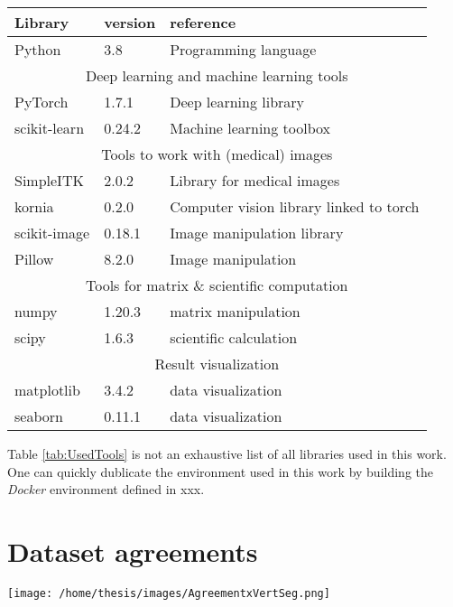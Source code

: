 \begin{SCtable}[\sidecaptionrelwidth][h]
 
  \begin{tabular}{ p{2cm} l l } 
   \hline
   \hline
   \textbf{Library} & \textbf{version} & \textbf{reference}    \\
   \hline 
  Python & 3.8 & Programming language \\
   \hline
   \multicolumn{3}{c}{Deep learning and machine learning tools} \\
   \hline
   PyTorch & 1.7.1 & Deep learning library \\ 
   scikit-learn & 0.24.2 & Machine learning toolbox \\
   \hline
   \multicolumn{3}{c}{Tools to work with (medical) images} \\
   \hline
   SimpleITK & 2.0.2 & Library for medical images \\ 
   kornia & 0.2.0 & Computer vision library linked to torch \\
   scikit-image & 0.18.1 & Image manipulation library \\
   Pillow & 8.2.0 & Image manipulation\\
   \hline
   \multicolumn{3}{c}{Tools for matrix \& scientific computation} \\
   \hline
   numpy & 1.20.3 & matrix manipulation \\
   scipy & 1.6.3 & scientific calculation \\
   \hline
   \multicolumn{3}{c}{Result visualization} \\
   \hline
   matplotlib & 3.4.2 & data visualization \\ 
   seaborn & 0.11.1 & data visualization \\
   \hline
   \hline
  \end{tabular}
  \caption{Python libraries used. \label{tab:UsedTools}}

\end{SCtable}

Table \ref{tab:UsedTools} is not an exhaustive list of all libraries used in this work.
One can quickly dublicate the environment used in this work by building the \textit{Docker} environment defined in xxx.


\chapter{Dataset agreements\label{seg:datasetagreement}}

\texttt{[image: /home/thesis/images/AgreementxVertSeg.png]}